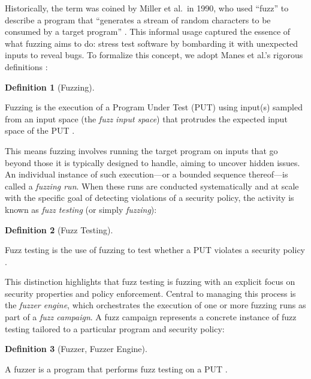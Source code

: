 \documentclass[
  a4paper,
]{scrreprt}
\theoremstyle{definition}
\newtheorem{definition}{Definition}[chapter]
\theoremstyle{remark}
\begin{document}
Historically, the term was coined by Miller et al.~in 1990, who used
``fuzz'' to describe a program that ``generates a stream of random
characters to be consumed by a target program'' \autocite{miller1990}.
This informal usage captured the essence of what fuzzing aims to do:
stress test software by bombarding it with unexpected inputs to reveal
bugs. To formalize this concept, we adopt Manes et al.'s rigorous
definitions \autocite{manes2019}:

\begin{definition}[Fuzzing]\protect\hypertarget{def-fuzzing}{}\label{def-fuzzing}

Fuzzing is the execution of a Program Under Test (PUT) using input(s)
sampled from an input space (the \emph{fuzz input space}) that protrudes
the expected input space of the PUT \autocite{manes2019}.

\end{definition}

This means fuzzing involves running the target program on inputs that go
beyond those it is typically designed to handle, aiming to uncover
hidden issues. An individual instance of such execution---or a bounded
sequence thereof---is called a \emph{fuzzing run}. When these runs are
conducted systematically and at scale with the specific goal of
detecting violations of a security policy, the activity is known as
\emph{fuzz testing} (or simply \emph{fuzzing}):

\begin{definition}[Fuzz
Testing]\protect\hypertarget{def-fuzz-testing}{}\label{def-fuzz-testing}

Fuzz testing is the use of fuzzing to test whether a PUT violates a
security policy \autocite{manes2019}.

\end{definition}

This distinction highlights that fuzz testing is fuzzing with an
explicit focus on security properties and policy enforcement. Central to
managing this process is the \emph{fuzzer engine}, which orchestrates
the execution of one or more fuzzing runs as part of a \emph{fuzz
campaign}. A fuzz campaign represents a concrete instance of fuzz
testing tailored to a particular program and security policy:

\begin{definition}[Fuzzer, Fuzzer
Engine]\protect\hypertarget{def-fuzzer}{}\label{def-fuzzer}

A fuzzer is a program that performs fuzz testing on a PUT
\autocite{manes2019}.

\end{definition}
\end{document}
